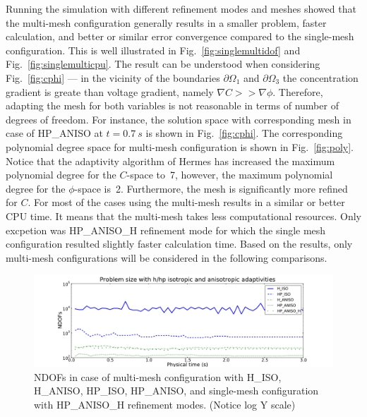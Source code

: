 Running the simulation with different refinement modes 
and meshes showed that the multi-mesh configuration generally results in
a smaller problem, faster calculation, and better or similar error convergence
compared to the single-mesh configuration.
This is well illustrated in Fig.~\ref{fig:singlemultidof} 
and Fig.~\ref{fig:singlemulticpu}.
The result can be understood when considering Fig.~\ref{fig:cphi} --- in the vicinity
of the boundaries $\partial \Omega_1$ and $\partial\Omega_3$ the concentration gradient
is greate than voltage gradient, namely $\nabla C >> \nabla \phi$. Therefore,
adapting the mesh for both variables is not reasonable in terms of
number of degrees of freedom. For instance,
the solution space with corresponding mesh in case of
HP\_ANISO at $t=0.7\ s$ is shown in Fig.~\ref{fig:cphi}. The corresponding polynomial
degree space for multi-mesh configuration is shown in Fig.~\ref{fig:poly}. 
Notice that the adaptivity algorithm
of Hermes has increased the maximum polynomial degree for the $C$-space to~7, however,
the maximum polynomial degree for the $\phi$-space is~2. Furthermore,
the mesh is significantly more refined for $C$.
For most of the cases using the multi-mesh results in a similar or better CPU time.
It means that the multi-mesh takes less computational resources. Only excpetion was HP\_ANISO\_H 
refinement mode for which the single mesh configuration resulted slightly faster
calculation time. 
Based on the results, only multi-mesh configurations will be considered
in the following comparisons.

\begin{figure}[!ht]
  \begin{centering}
  \includegraphics[width=\columnwidth]{isoaniso_dof}
  \caption{\label{fig:isoanisodof} NDOFs in case 
  of multi-mesh configuration with H\_ISO, H\_ANISO,
  HP\_ISO, HP\_ANISO, and single-mesh configuration with HP\_ANISO\_H
  refinement modes. (Notice log Y scale)}
  \end{centering}
\end{figure}

